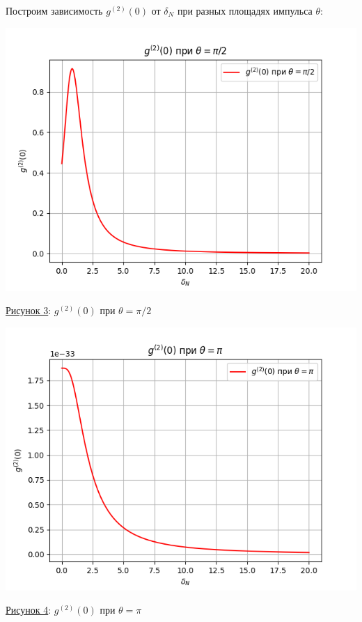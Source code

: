 \documentclass[11pt]{article}    %
\begin{document}
Построим зависимость $g^{(2)}(0)$ от $\delta_N$ при разных площадях импульса $\theta$:
\par
\begin{center}
\includegraphics[scale = 0.8]{plot3.png}
\par
    \underline{Рисунок 3}: $g^{(2)}(0)$ при $\theta = \pi/2$
\end{center}
\par
\begin{center}
\includegraphics[scale = 0.8]{plot4.png}
\par
    \underline{Рисунок 4}: $g^{(2)}(0)$ при $\theta = \pi$
\end{center}
\par
\end{document}
